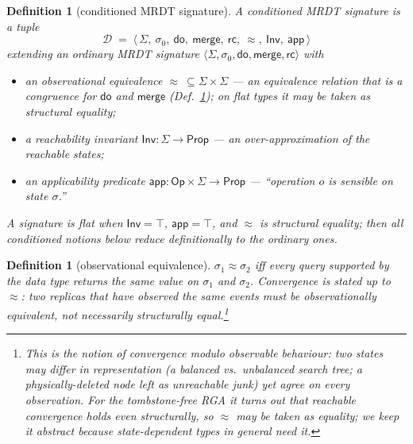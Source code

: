 \documentclass[11pt]{article}
\newtheorem{definition}[theorem]{Definition}
\newcommand{\Merge}{\mathsf{merge}}
\newcommand{\Sinit}{\sigma_0}
\newcommand{\dolab}{\mathsf{do}}
\newcommand{\Inv}{\mathsf{Inv}}
\newcommand{\app}{\mathsf{app}}
\newcommand{\eqobs}{\approx}
\begin{document}
\begin{definition}[conditioned MRDT signature]
\label{def:sig}
A \emph{conditioned MRDT signature} is a tuple
\[
  \mathcal{D} \;=\;
  \langle\, \Sigma,\ \Sinit,\ \dolab,\ \Merge,\ \mathsf{rc},\
  \eqobs,\ \Inv,\ \app \,\rangle
\]
extending an ordinary MRDT signature $\langle
\Sigma,\Sinit,\dolab,\Merge,\mathsf{rc}\rangle$ with
\begin{itemize}[leftmargin=1.4em]
\item an \emph{observational equivalence} $\eqobs\ \subseteq \Sigma\times\Sigma$
  --- an equivalence relation that is a congruence for $\dolab$ and $\Merge$
  (Def.~\ref{def:obs}); on flat types it may be taken as structural equality;
\item a \emph{reachability invariant} $\Inv:\Sigma\to\mathsf{Prop}$ --- an
  over-approximation of the reachable states;
\item an \emph{applicability} predicate $\app:\mathsf{Op}\times\Sigma\to
  \mathsf{Prop}$ --- ``operation $o$ is sensible on state $\sigma$.''
\end{itemize}
A signature is \emph{flat} when $\Inv=\top$, $\app=\top$, and $\eqobs$ is
structural equality; then all conditioned notions below reduce definitionally to
the ordinary ones.
\end{definition}

\begin{definition}[observational equivalence]
\label{def:obs}
$\sigma_1 \eqobs \sigma_2$ iff every query supported by the data type returns the
same value on $\sigma_1$ and $\sigma_2$. Convergence is stated up to $\eqobs$:
two replicas that have observed the same events must be observationally
equivalent, not necessarily structurally equal.\footnote{This is the notion of
\emph{convergence modulo observable behaviour}: two states may differ in
representation (a balanced vs.\ unbalanced search tree; a physically-deleted node
left as unreachable junk) yet agree on every observation. For the tombstone-free
RGA it turns out that reachable convergence holds even \emph{structurally}, so
$\eqobs$ may be taken as equality; we keep it abstract because state-dependent
types in general need it.}
\end{definition}
\end{document}
